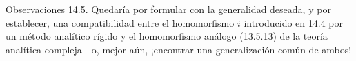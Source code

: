 \medskip
\noindent
\underline{Observaciones 14.5.} Quedaría por formular con la generalidad
deseada, y por establecer, una compatibilidad entre el homomorfismo $i$
introducido en 14.4 por un método analítico rígido y el homomorfismo
análogo (13.5.13) de la teoría analítica compleja---o, mejor aún,
¡encontrar una generalización común de ambos!
